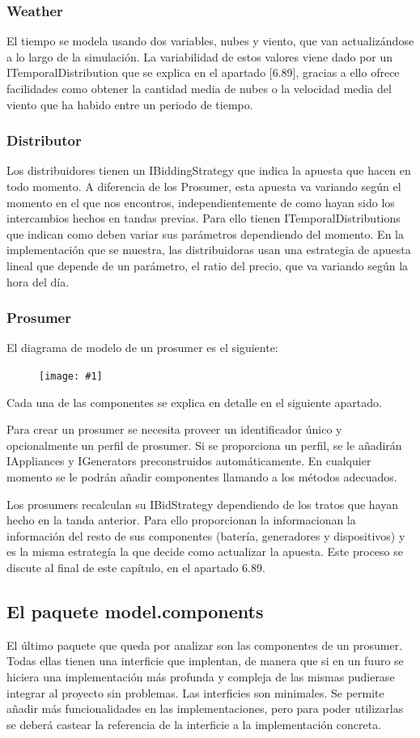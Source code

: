 \documentclass[12pt,a4paper,openright,oneside]{article}
\newcommand{\includeImage}[1]
{
	\begin{figure}[htb]
	\begin{center}
	\texttt{[image: \#1]}
	\end{center}
	\end{figure}
}
\numberwithin{equation}{section}
\theoremstyle{definition}
\begin{document}
\subsubsection{Weather}

El tiempo se modela usando dos variables, nubes y viento, que van actualizándose a lo largo de la simulación. La variabilidad de estos valores viene dado por un ITemporalDistribution que se explica en el apartado [6.89], gracias a ello ofrece facilidades como obtener la cantidad media de nubes o la velocidad media del viento que ha habido entre un periodo de tiempo. 

\subsubsection{Distributor}

Los distribuidores tienen un IBiddingStrategy que indica la apuesta que hacen en todo momento. A diferencia de los Prosumer, esta apuesta va variando según el momento en el que nos encontros, independientemente de como hayan sido los intercambios hechos en tandas previas. Para ello tienen ITemporalDistributions que indican como deben variar sus parámetros dependiendo del momento. En la implementación que se muestra, las distribuidoras usan una estrategia de apuesta lineal que depende de un parámetro, el ratio del precio, que va variando según la hora del día. 

\subsubsection{Prosumer}
El diagrama de modelo de un prosumer es el siguiente:
\includeImage{modelo_prosumer}
Cada una de las componentes se explica en detalle en el siguiente apartado.

Para crear un prosumer se necesita proveer un identificador único y opcionalmente un perfil de prosumer. Si se proporciona un perfil, se le añadirán IAppliances y IGenerators preconstruidos automáticamente. En cualquier momento se le podrán añadir componentes llamando a los métodos adecuados.

Los prosumers recalculan su IBidStrategy dependiendo de los tratos que hayan hecho en la tanda anterior. Para ello proporcionan la informacionan la información del resto de sus componentes (batería, generadores y dispositivos) y es la misma estrategía la que decide como actualizar la apuesta. Este proceso se discute al final de este capítulo, en el apartado 6.89.
\subsection{El paquete model.components} 
El último paquete que queda por analizar son las componentes de un prosumer. Todas ellas tienen una interficie que implentan, de manera que si en un fuuro se hiciera una implementación más profunda y compleja de las mismas pudierase integrar al proyecto sin problemas. Las interficies son minimales. Se permite añadir más funcionalidades en las implementaciones, pero para poder utilizarlas se deberá castear la referencia de la interficie a la implementación concreta.
\end{document}
